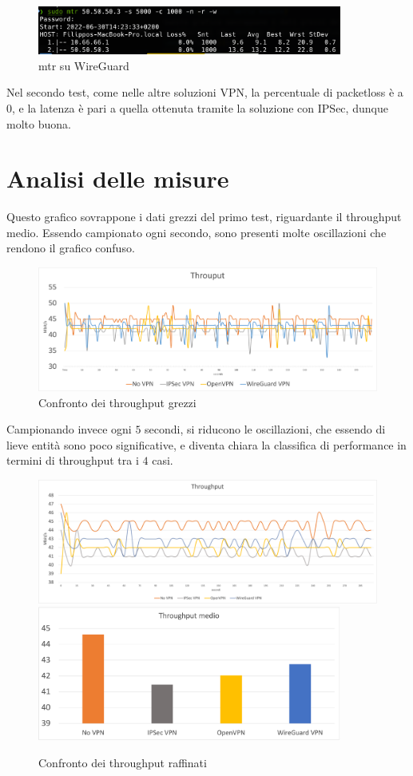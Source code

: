 \begin{figure}[ht]
    \centering
    \includegraphics[width=10cm]{figure/mrt_16min_wg.png}
    \caption{mtr su WireGuard}
\end{figure}

Nel secondo test, come nelle altre soluzioni VPN, la percentuale di packetloss è a $0$, e la latenza è pari a quella ottenuta tramite la soluzione con IPSec, dunque molto buona.

\section{Analisi delle misure}
Questo grafico sovrappone i dati grezzi del primo test, riguardante il throughput medio. Essendo campionato ogni secondo, sono presenti molte oscillazioni che rendono il grafico confuso.
\begin{figure}[ht]
    \centering
    \includegraphics[width=14cm]{figure/rawThroughput.png}
    \caption{Confronto dei throughput grezzi}
\end{figure}

Campionando invece ogni $5$ secondi, si riducono le oscillazioni, che essendo di lieve entità sono poco significative, e diventa chiara la classifica di performance in termini di throughput tra i $4$ casi.


\begin{figure}[ht]
    \centering
    \includegraphics[width=14cm]{figure/fineThroughput.png}
    \includegraphics[width=10cm]{figure/avg.png}
    \caption{Confronto dei throughput raffinati}
\end{figure}

